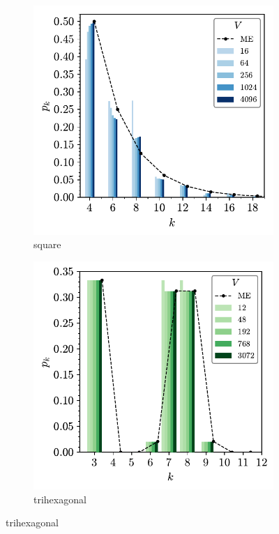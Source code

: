\begin{figure}[btp]
     \centering
     
     \begin{subfigure}[b]{0.40\textwidth}
         \centering
         \includegraphics[width=\textwidth]{./figures/procrystals/sq3_pk.pdf}
         \caption{square}
         \label{fig:pro3pka}
     \end{subfigure}
         \hspace{1cm}
      \begin{subfigure}[b]{0.40\textwidth}
         \centering
         \includegraphics[width=\textwidth]{./figures/procrystals/trihex3_pk.pdf}
         \caption{trihexagonal}
         \label{fig:pro3pkb}
     \end{subfigure}
 

\end{figure}
